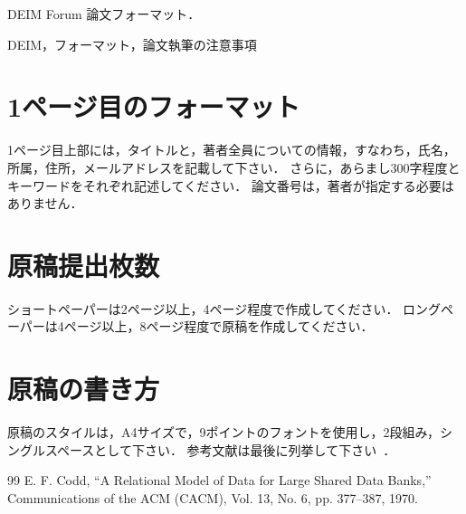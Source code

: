 \documentclass{deimj}
\begin{document}
\pagestyle{empty}

\begin{jabstract}
DEIM Forum 論文フォーマット．
\end{jabstract}

\begin{jkeyword}
DEIM，フォーマット，論文執筆の注意事項
\end{jkeyword}

\maketitle

\section{1ページ目のフォーマット}

1ページ目上部には，タイトルと，著者全員についての情報，すなわち，氏名，所属，住所，メールアドレスを記載して下さい．
さらに，あらまし300字程度とキーワードをそれぞれ記述してください．
論文番号は，著者が指定する必要はありません．

\section{原稿提出枚数}

ショートペーパーは2ページ以上，4ページ程度で作成してください．
ロングペーパーは4ページ以上，8ページ程度で原稿を作成してください．

\section{原稿の書き方}

原稿のスタイルは，A4サイズで，9ポイントのフォントを使用し，2段組み，シングルスペースとして下さい．
参考文献は最後に列挙して下さい~\cite{Codd1970}．


\vspace{2em}

\begin{thebibliography}{99}
  E. F. Codd, 
  ``A Relational Model of Data for Large Shared Data Banks,''
  Communications of the {ACM} (CACM), Vol. 13, No. 6, pp. 377--387, 1970.
\end{thebibliography}

% 
% 
\end{document}
